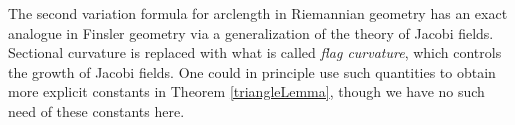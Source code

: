 \begin{remark}
    The second variation formula for arclength in Riemannian geometry has an exact analogue in Finsler geometry via a generalization of the theory of Jacobi fields. Sectional curvature is replaced with what is called \emph{flag curvature}, which controls the growth of Jacobi fields. One could in principle use such quantities to obtain more explicit constants in Theorem \ref{triangleLemma}, though we have no such need of these constants here.
\end{remark}



%
%

